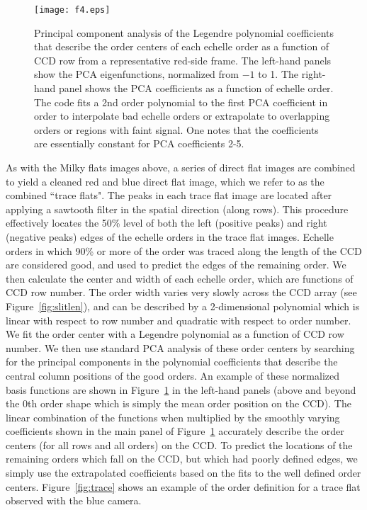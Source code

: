 \documentclass[]{emulateapj}
\begin{document}
\begin{figure}
\texttt{[image: f4.eps]}
\caption{Principal component analysis of the Legendre polynomial coefficients
that describe the order centers of each echelle order as a function of CCD row
from a representative red-side frame.  The left-hand panels show the
PCA eigenfunctions, normalized from $-1$ to 1.  The right-hand panel
shows the PCA coefficients as a function of echelle order.  The code
fits a 2nd order polynomial to the first PCA coefficient in order to
interpolate bad echelle orders or extrapolate to overlapping orders or
regions with faint signal.  One notes that the coefficients are essentially
constant for PCA coefficients 2-5.
}
\label{fig:pca}
\end{figure}

As with the Milky flats images above, a series of direct flat images
are combined to yield a cleaned red and blue
direct flat image, which we refer to as the combined ``trace flats".
The peaks in each trace flat image are located after applying a sawtooth filter
in the spatial direction (along rows).  This procedure effectively locates
the 50\% level of both the left (positive peaks) and right (negative peaks)
edges of the echelle orders in the trace flat images.  Echelle orders in which
90\% or more of the order was traced along the length of the CCD are considered good, and used to predict the edges of the remaining order.  
We then calculate the center and width of each echelle order, which are
functions of CCD row number.
The order width varies very slowly across the
CCD array (see Figure~\ref{fig:slitlen}), and can be described by a 2-dimensional
polynomial which is linear with respect to row number and quadratic with 
respect to order number.  
We fit the order center with a Legendre polynomial as a function
of CCD row number. We then use standard
PCA analysis \citep{PCA} of these order centers 
by searching for the principal components in the 
polynomial coefficients that describe the central column positions of the 
good orders.  
An example of these normalized basis functions are shown in Figure~\ref{fig:pca} 
in the 
left-hand panels (above and beyond the 0th order shape which is simply the 
mean order position on the CCD).  The linear combination of the functions when
multiplied by the smoothly varying coefficients shown in the main panel of
Figure~\ref{fig:pca}
accurately describe the order centers (for all rows and all orders) on the CCD.
To predict the locations of the remaining orders which fall on the CCD, 
but which had poorly defined edges, we simply use the extrapolated
coefficients based on the fits to the well defined order centers.
Figure~\ref{fig:trace} shows an example of the order definition for
a trace flat observed with the blue camera.  
\end{document}
